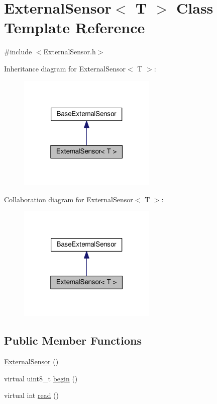 \hypertarget{class_external_sensor}{}\section{External\+Sensor$<$ T $>$ Class Template Reference}
\label{class_external_sensor}


{\ttfamily \#include $<$External\+Sensor.\+h$>$}



Inheritance diagram for External\+Sensor$<$ T $>$\+:\nopagebreak
\begin{figure}[H]
\begin{center}
\leavevmode
\includegraphics[width=187pt]{class_external_sensor__inherit__graph}
\end{center}
\end{figure}


Collaboration diagram for External\+Sensor$<$ T $>$\+:\nopagebreak
\begin{figure}[H]
\begin{center}
\leavevmode
\includegraphics[width=187pt]{class_external_sensor__coll__graph}
\end{center}
\end{figure}
\subsection*{Public Member Functions}
\begin{DoxyCompactItemize}
\item 
\hyperlink{class_external_sensor_a8b991447fba33253103d06198b838751}{External\+Sensor} ()
\item 
virtual uint8\+\_\+t \hyperlink{class_external_sensor_ab6fe1379d55b656a048e0fba1e0a32e6}{begin} ()
\item 
virtual int \hyperlink{class_external_sensor_a6dbf2d6b1c183740ce0f153d6e43ccb2}{read} ()
\end{DoxyCompactItemize}


